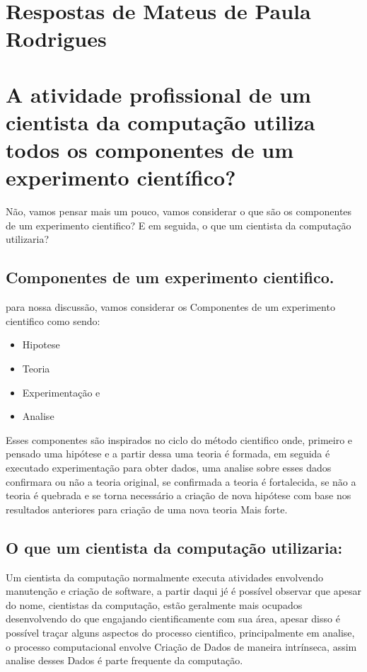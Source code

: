 \section{Respostas de Mateus de Paula Rodrigues\label{tarefa-MoustacheGolem-componentes-eperimento}}

\section{A atividade profissional de um cientista da computação
utiliza todos os componentes de um experimento científico?}

Não, vamos pensar mais um pouco,  vamos considerar o que são os componentes de um experimento cientifico? E em seguida, o que um cientista da computação utilizaria?

\subsection{Componentes de um experimento cientifico.}

para nossa discussão, vamos considerar os Componentes de um experimento cientifico como sendo:

\begin{itemize}
    \item \gls{Hipotese}
    \item Teoria
    \item Experimentação e 
    \item Analise
\end{itemize}


Esses componentes são inspirados no ciclo do método cientifico onde, primeiro e pensado uma hipótese e a partir dessa uma teoria é formada, em seguida é executado experimentação para obter dados, uma analise sobre esses dados confirmara ou não a teoria original, se confirmada a teoria é fortalecida, se não a teoria é quebrada e se torna necessário a criação de nova hipótese com base nos resultados anteriores para criação de uma nova teoria Mais forte.

\subsection{O que um cientista da computação utilizaria:}
Um cientista da computação normalmente executa atividades envolvendo manutenção e criação de software, a partir daqui jé é possível observar que apesar do nome, cientistas da computação, estão geralmente mais ocupados desenvolvendo do que engajando cientificamente com sua área, apesar disso é possível traçar alguns aspectos do processo cientifico, principalmente em analise, o processo computacional envolve Criação de \gls{Dado}s de maneira intrínseca, assim analise desses Dados é parte frequente da computação.

